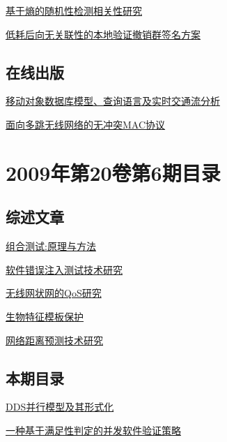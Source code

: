 \documentclass[a4paper]{article}
\begin{document}
\href{http://www.jos.org.cn/ch/reader/download_pdf.aspx?file_no=3277&year_id=2009&quarter_id=7&falg=1}{基于熵的随机性检测相关性研究}

\href{http://www.jos.org.cn/ch/reader/download_pdf.aspx?file_no=559&year_id=2009&quarter_id=7&falg=1}{低耗后向无关联性的本地验证撤销群签名方案}

\subsection{在线出版}
\href{http://www.jos.org.cn/ch/reader/download_pdf.aspx?file_no=571&year_id=2009&quarter_id=7&falg=1}{移动对象数据库模型、查询语言及实时交通流分析}

\href{http://www.jos.org.cn/ch/reader/download_pdf.aspx?file_no=3397&year_id=2009&quarter_id=7&falg=1}{面向多跳无线网络的无冲突MAC协议}


\section{\textbf{2009年第20卷第6期目录}}
\subsection{综述文章}
\href{http://www.jos.org.cn/ch/reader/download_pdf.aspx?file_no=3497&year_id=2009&quarter_id=6&falg=1}{组合测试:原理与方法}

\href{http://www.jos.org.cn/ch/reader/download_pdf.aspx?file_no=3526&year_id=2009&quarter_id=6&falg=1}{软件错误注入测试技术研究}

\href{http://www.jos.org.cn/ch/reader/download_pdf.aspx?file_no=3533&year_id=2009&quarter_id=6&falg=1}{无线网状网的QoS研究}

\href{http://www.jos.org.cn/ch/reader/download_pdf.aspx?file_no=3528&year_id=2009&quarter_id=6&falg=1}{生物特征模板保护}

\href{http://www.jos.org.cn/ch/reader/download_pdf.aspx?file_no=3530&year_id=2009&quarter_id=6&falg=1}{网络距离预测技术研究}

\subsection{本期目录}
\href{http://www.jos.org.cn/ch/reader/download_pdf.aspx?file_no=3424&year_id=2009&quarter_id=6&falg=1}{DDS并行模型及其形式化}

\href{http://www.jos.org.cn/ch/reader/download_pdf.aspx?file_no=558&year_id=2009&quarter_id=6&falg=1}{一种基于满足性判定的并发软件验证策略}
\end{document}
